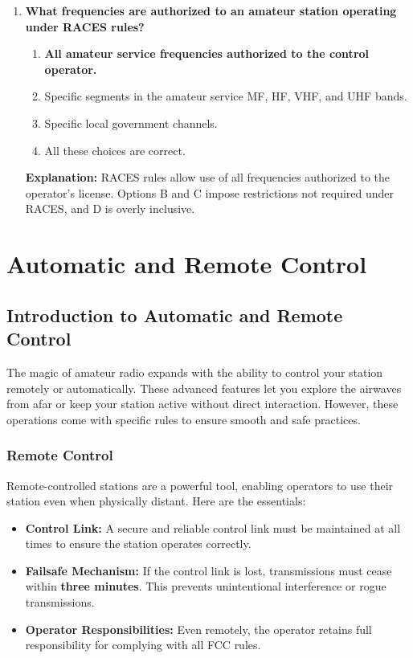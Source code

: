 \begin{enumerate}
\item \textbf{What frequencies are authorized to an amateur station operating under RACES rules?}
\begin{enumerate}
    \item \textbf{All amateur service frequencies authorized to the control operator.}\\
    \item Specific segments in the amateur service MF, HF, VHF, and UHF bands.\\
    \item Specific local government channels.\\
    \item All these choices are correct.
\end{enumerate}
\textbf{Explanation:} RACES rules allow use of all frequencies authorized to the operator’s license. Options B and C impose restrictions not required under RACES, and D is overly inclusive.

\end{enumerate}




\section{Automatic and Remote Control}

\subsection*{Introduction to Automatic and Remote Control}
The magic of amateur radio expands with the ability to control your station remotely or automatically. These advanced features let you explore the airwaves from afar or keep your station active without direct interaction. However, these operations come with specific rules to ensure smooth and safe practices.

\subsubsection*{Remote Control}
Remote-controlled stations are a powerful tool, enabling operators to use their station even when physically distant. Here are the essentials:
\begin{itemize}
    \item \textbf{Control Link:} A secure and reliable control link must be maintained at all times to ensure the station operates correctly.
    \item \textbf{Failsafe Mechanism:} If the control link is lost, transmissions must cease within \textbf{three minutes}. This prevents unintentional interference or rogue transmissions.
    \item \textbf{Operator Responsibilities:} Even remotely, the operator retains full responsibility for complying with all FCC rules.
\end{itemize}

